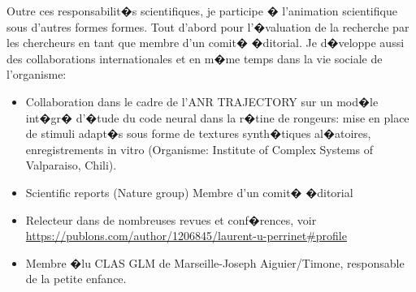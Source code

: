 Outre ces responsabilit�s scientifiques, je participe � l'animation scientifique sous d'autres formes formes. Tout d'abord pour l'�valuation de la recherche par les chercheurs en tant que membre d'un comit� �ditorial. Je d�veloppe aussi des collaborations internationales et en m�me temps dans la vie sociale de l'organisme:


\begin{itemize}

	\item Collaboration dans le cadre de l'ANR TRAJECTORY sur un mod�le int�gr� d'�tude du code neural dans la r�tine de rongeurs:  mise en place de stimuli adapt�s sous forme de textures synth�tiques al�atoires, enregistrements in vitro (Organisme: Institute of Complex Systems of Valparaiso, Chili).


	\item Scientific reports (Nature group) Membre d'un comit� �ditorial

	\item  Relecteur dans de nombreuses revues et conf�rences, voir \url{https://publons.com/author/1206845/laurent-u-perrinet#profile}

	\item Membre �lu CLAS GLM de Marseille-Joseph Aiguier/Timone, responsable de la petite enfance.

\end{itemize}



\newpage
